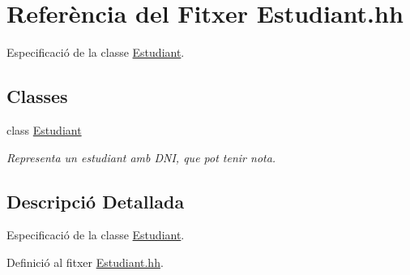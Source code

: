 \hypertarget{_estudiant_8hh}{\section{Referència del Fitxer Estudiant.\+hh}
\label{_estudiant_8hh}
}


Especificació de la classe \hyperlink{class_estudiant}{Estudiant}.  


\subsection*{Classes}
\begin{DoxyCompactItemize}
\item 
class \hyperlink{class_estudiant}{Estudiant}
\begin{DoxyCompactList}\small\item\em Representa un estudiant amb D\+N\+I, que pot tenir nota. \end{DoxyCompactList}\end{DoxyCompactItemize}


\subsection{Descripció Detallada}
Especificació de la classe \hyperlink{class_estudiant}{Estudiant}. 



Definició al fitxer \hyperlink{_estudiant_8hh_source}{Estudiant.\+hh}.

